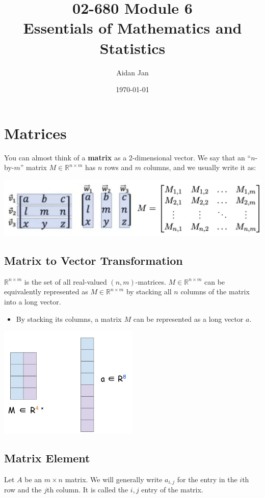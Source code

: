 \documentclass[10pt]{article}
\title{02-680 Module 6 \\ \large{Essentials of Mathematics and Statistics}}
\author{Aidan Jan}
\date{\today}
\begin{document}
\maketitle

\section*{Matrices}
You can almost think of a \textbf{matrix} as a 2-dimensional vector.  We say that an ``$n$-by-$m$'' matrix $M \in \mathbb{R}^{n \times m}$ has $n$ rows and $m$ columns, and we usually write it as:
\begin{center} 
	\includegraphics*[width=\textwidth]{M6_1.png} 
\end{center}

\subsection*{Matrix to Vector Transformation}
$\mathbb{R}^{n \times m}$ is the set of all real-valued $(n, m)$-matrices.  $M \in \mathbb{R}^{n \times m}$ can be equivalently represented as $M \in \mathbb{R}^{n \times m}$ by stacking all $n$ columns of the matrix into a long vector.
\begin{itemize}
	\item By stacking its columns, a matrix $M$ can be represented as a long vector $a$.
\end{itemize}
\begin{center} 
	\includegraphics*[width=0.5\textwidth]{M6_2.png} 
\end{center}

\subsection*{Matrix Element}
Let $A$ be an $m \times n$ matrix.  We will generally write $a_{i, j}$ for the entry in the $i$th row and the $j$th column.  It is called the $i, j$ entry of the matrix.
\end{document}
